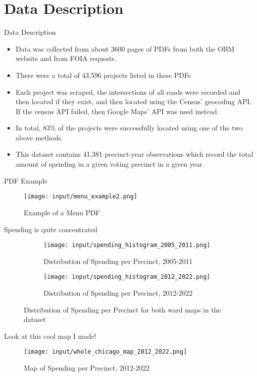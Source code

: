 \section{Data Description}

\begin{frame}{Data Description}
    \begin{itemize}
        \item Data was collected from about 3600 pages of PDFs from both the OBM website and from FOIA requests.
        \item There were a total of 43,596 projects listed in these PDFs
        \item Each project was scraped, the intersections of all roads were recorded and then located if they exist, and then located using the Census' geocoding API. If the census API failed, then Google Maps' API was used instead.
        \item In total, 83\% of the projects were successfully located using one of the two above methods.
        \item This dataset contains 41,381 precinct-year observations which record the total amount of spending in a given voting precinct in a given year.
    \end{itemize}
\end{frame}

\begin{frame}{PDF Example}
    \begin{figure}[H]
        \centering
        \texttt{[image: input/menu\_example2.png]}
        \caption{Example of a Menu PDF}
        \label{fig:menu_example}
    \end{figure}
\end{frame}

\begin{frame}{Spending is quite concentrated}
    \begin{figure}[H]
        \centering
        \begin{subfigure}[b]{0.45\textwidth} %
          \texttt{[image: input/spending\_histogram\_2005\_2011.png]}
          \caption{Distribution of Spending per Precinct, 2005-2011}
          \label{fig:sub1}
        \end{subfigure}
        \hfill %
        \begin{subfigure}[b]{0.45\textwidth}
          \texttt{[image: input/spending\_histogram\_2012\_2022.png]}
          \caption{Distribution of Spending per Precinct, 2012-2022}
          \label{fig:sub2}
        \end{subfigure}
      
        \caption{Distribution of Spending per Precinct for both ward maps in the dataset}
        \label{fig:spending_hist}
      \end{figure}
\end{frame}

\begin{frame}{Look at this cool map I made!}
    \begin{figure}[H]
        \centering
        \texttt{[image: input/whole\_chicago\_map\_2012\_2022.png]}
        \caption{Map of Spending per Precinct, 2012-2022}
        \label{fig:spending_map}
    \end{figure}
\end{frame}